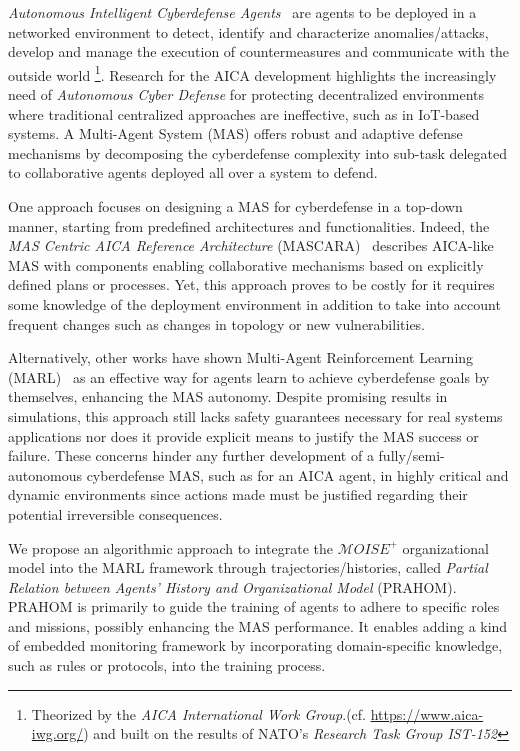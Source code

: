 \documentclass[conference]{IEEEtran}
\begin{document}
\textit{Autonomous Intelligent Cyberdefense Agents}~\cite{Kott2023} are agents to be deployed in a networked environment to detect, identify and characterize anomalies/attacks, develop and manage the execution of countermeasures and communicate with the outside world
%
\footnote{
    Theorized by the \textit{AICA International Work Group}.(cf. \url{https://www.aica-iwg.org/}) and built on the results of NATO's \textit{Research Task Group IST-152}
}.
%
Research for the AICA development highlights the increasingly need of \textit{Autonomous Cyber Defense} for protecting decentralized environments where traditional centralized approaches are ineffective, such as in IoT-based systems. A Multi-Agent System (MAS) offers robust and adaptive defense mechanisms by decomposing the cyberdefense complexity into sub-task delegated to collaborative agents deployed all over a system to defend.

One approach focuses on designing a MAS for cyberdefense in a top-down manner, starting from predefined architectures and functionalities. Indeed, the \textit{MAS Centric AICA Reference Architecture} (MASCARA)~\cite{Kott2023} describes AICA-like MAS with components enabling collaborative mechanisms based on explicitly defined plans or processes. Yet, this approach proves to be costly for it requires some knowledge of the deployment environment in addition to take into account frequent changes such as changes in topology or new vulnerabilities.

Alternatively, other works have shown Multi-Agent Reinforcement Learning (MARL)~\cite{Albrecht2024} as an effective way for agents learn to achieve cyberdefense goals by themselves, enhancing the MAS autonomy. Despite promising results in simulations, this approach still lacks safety guarantees necessary for real systems applications nor does it provide explicit means to justify the MAS success or failure.
%
These concerns hinder any further development of a fully/semi-autonomous cyberdefense MAS, such as for an AICA agent, in highly critical and dynamic environments since actions made must be justified regarding their potential irreversible consequences.

We propose an algorithmic approach to integrate the $\mathcal{M}OISE^+$ organizational model into the MARL framework through trajectories/histories, called \textit{Partial Relation between Agents' History and Organizational Model} (PRAHOM). PRAHOM is primarily to guide the training of agents to adhere to specific roles and missions, possibly enhancing the MAS performance. It enables adding a kind of embedded monitoring framework by incorporating domain-specific knowledge, such as rules or protocols, into the training process.
\end{document}
